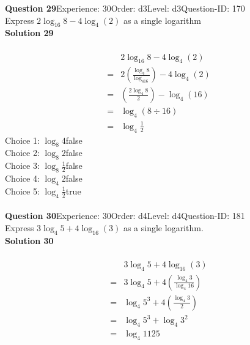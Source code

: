 \documentclass{article}
\begin{document}
\noindent\textbf{Question 29}\hspace{20pt}Experience: 30\hspace{20pt}Order: d3\hspace{20pt}Level: d3\hspace{20pt}Question-ID: 170\\[2pt]
Express $2\log_{16}8-4\log_{4}(2)$ as a single logarithm\\[4pt]
\noindent\textbf{Solution 29}\\[2pt]
\\[-35pt]\begin{align*}
&2\log_{16}8-4\log_{4}(2)\\[2pt]
=&2\left(\displaystyle\frac{\log_{4}8}{\log_416}\right)-4\log_{4}(2)\\[2pt]
=&\left(\displaystyle\frac{2\log_{4}8}{2}\right)-\log_{4}(16)\\[2pt]
=&\log_{4}(8 \div 16)\\[2pt]
=&\log_{4}\displaystyle\frac{1}{2}
\end{align*}
Choice 1: \hspace{20pt}$\log_{8}4$\hspace{20pt}false\\
Choice 2: \hspace{20pt}$\log_{8}2$\hspace{20pt}false\\
Choice 3: \hspace{20pt}$\log_{8}\displaystyle\frac{1}{2}$\hspace{20pt}false\\
Choice 4: \hspace{20pt}$\log_{4}2$\hspace{20pt}false\\
Choice 5: \hspace{20pt}$\log_{4}\displaystyle\frac{1}{2}$\hspace{20pt}true\\
\\[4pt]
\noindent\textbf{Question 30}\hspace{20pt}Experience: 30\hspace{20pt}Order: d4\hspace{20pt}Level: d4\hspace{20pt}Question-ID: 181\\[2pt]
Express $3\log_{4}5+4\log_{16}(3)$ as a single logarithm.\\[4pt]
\noindent\textbf{Solution 30}\\[2pt]
\\[-35pt]\begin{align*}
&3\log_{4}5+4\log_{16}(3)\\[2pt]
=&3\log_{4}5+4\left(\displaystyle\frac{\log_{4}3}{\log_{4}16}\right)\\[2pt]
=&\log_{4}5^3+4\left(\displaystyle\frac{\log_{4}3}{2}\right)\\[2pt]
=&\log_{4}5^3+\log_{4}3^2\\[2pt]
=&\log_{4}1125\\[-120pt]
\end{align*}
\end{document}
